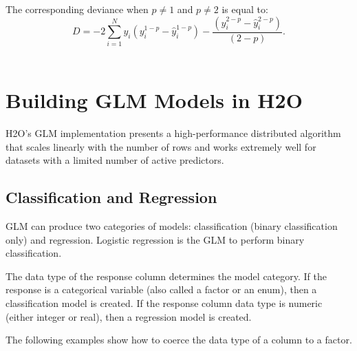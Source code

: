 The corresponding deviance when $p \neq 1$ and $p\neq 2$ is equal to:
$$D = -2 \sum_{i=1}^{N} y_i  (y_i^{1-p} - \hat{y}_i^{1-p} ) - \frac{(y_i^{2 - p} - \hat{y}_i^{2 - p})}{(2 - p)}. $$\\

%

%


\section{Building GLM Models in H2O}

H2O's GLM implementation presents a high-performance distributed algorithm that scales linearly with the number
of rows and works extremely well for datasets with a limited number of active predictors.

\subsection{Classification and Regression}

GLM can produce two categories of models: classification (binary classification only) and regression. Logistic regression is the GLM to perform binary classification.

The data type of the response column determines the model category.  If the response is a categorical variable
(also called a factor or an enum), then a classification model is created.  If the response column data type is
numeric (either integer or real), then a regression model is created. 

The following examples show how to coerce the data type of a column to a factor.

\waterExampleInR


\newpage
\waterExampleInPython


